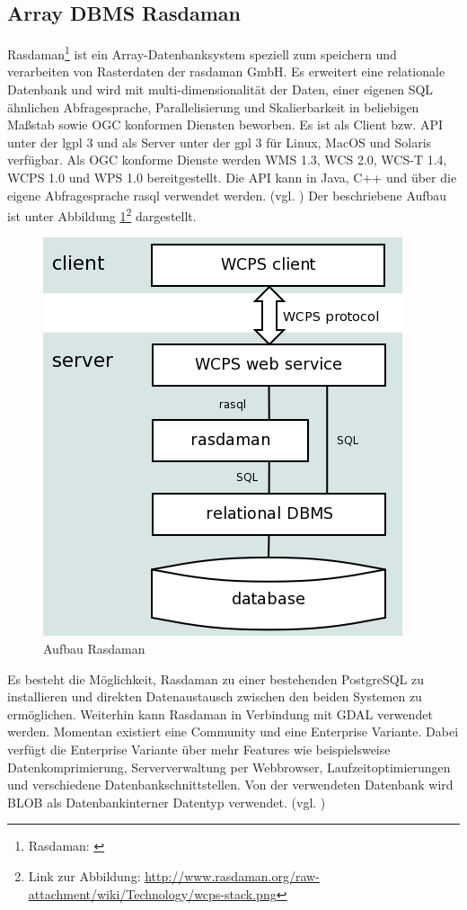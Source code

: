 \subsection{Array DBMS Rasdaman}
Rasdaman\footnote{Rasdaman: \cite{website:rasdaman.org}} ist ein Array-Datenbanksystem speziell zum speichern und verarbeiten von Rasterdaten der rasdaman GmbH.
Es erweitert eine relationale Datenbank und wird mit  multi-dimensionalität der Daten, einer eigenen SQL ähnlichen Abfragesprache, Parallelisierung und Skalierbarkeit in beliebigen Maßstab sowie OGC konformen Diensten beworben.
Es ist als Client bzw. API unter der \Gls{lgpl} 3 und als Server unter der \Gls{gpl} 3 für Linux, MacOS und Solaris verfügbar.
Als OGC konforme Dienste werden WMS 1.3, WCS 2.0, WCS-T 1.4, WCPS 1.0 und WPS 1.0 bereitgestellt.
Die API kann in Java, C++ und über die eigene Abfragesprache rasql verwendet werden. (vgl. \cite{website:rasdamanogeo})
Der beschriebene Aufbau ist unter Abbildung \ref{fig:rasdaman}\footnote{Link zur Abbildung: \url{http://www.rasdaman.org/raw-attachment/wiki/Technology/wcps-stack.png}} dargestellt.
\begin{figure}[h!]
\centering
\includegraphics[width=.4\textwidth]{Abbildungen/rasdaman-aufbau.png}
\caption[Aufbau Rasdaman]{Aufbau Rasdaman}
\label{fig:rasdaman}
\end{figure}

Es besteht die Möglichkeit, Rasdaman zu einer bestehenden PostgreSQL zu installieren und direkten Datenaustausch zwischen den beiden Systemen zu ermöglichen.
Weiterhin kann Rasdaman in Verbindung mit GDAL verwendet werden.
Momentan existiert eine Community und eine Enterprise Variante. Dabei verfügt die Enterprise Variante über mehr Features wie beispielsweise Datenkomprimierung, Serververwaltung per Webbrowser, Laufzeitoptimierungen und verschiedene Datenbankschnittstellen.
Von der verwendeten Datenbank wird BLOB als Datenbankinterner Datentyp verwendet. (vgl. \cite{website:rasdamanowiki})